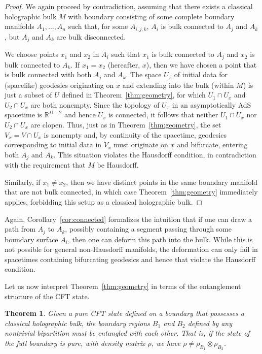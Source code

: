 \documentclass[12pt,english]{article}
\newtheorem{theorem}{Theorem}
\begin{document}
\begin{proof}
We again proceed by contradiction, assuming that there exists a classical holographic bulk $M$ with boundary consisting of some complete boundary manifolds $A_1,\ldots,A_n$ such that, for some $A_{i,j,k}$, $A_i$ is bulk connected to $A_j$ and $A_k$, but $A_j$ and $A_k$ are bulk disconnected. 

We choose points $x_1$ and $x_2$ in $A_i$ such that $x_1$ is bulk connected to $A_j$ and $x_2$ is bulk connected to $A_k$. If $x_1 = x_2$ (hereafter, $x$), then we have chosen a point that is bulk connected with both $A_j$ and $A_k$. The space $U_x$ of initial data for (spacelike) geodesics originating on $x$ and extending into the bulk (within $M$) is just a subset of $U$ defined in Theorem~\ref{thm:geometry}, for which $U_1 \cap U_x$ and $U_2 \cap U_x$ are both nonempty. Since the topology of $U_x$ in an asymptotically AdS spacetime is $\mathbb{R}^{D-2}$ and hence $U_x$ is connected, it follows that neither $U_1 \cap U_x$ nor $U_2 \cap U_x$ are clopen. Thus, just as in Theorem~\ref{thm:geometry}, the set $V_x = V \cap U_x$ is nonempty and, by continuity of the spacetime, geodesics corresponding to initial data in $V_x$ must originate on $x$ and bifurcate, entering both $A_j$ and $A_k$. This situation violates the Hausdorff condition, in contradiction with the requirement that $M$ be Hausdorff. 

Similarly, if $x_1 \neq x_2$, then we have distinct points in the same boundary manifold that are not bulk connected, in which case Theorem~\ref{thm:geometry} immediately applies, forbidding this setup as a classical holographic bulk.
\end{proof}

Again, Corollary~\ref{cor:connected} formalizes the intuition that if one can draw a path from $A_j$ to $A_k$, possibly containing a segment passing through some boundary surface $A_i$, then one can deform this path into the bulk. While this is not possible for general non-Hausdorff manifolds, the deformation can only fail in spacetimes containing bifurcating geodesics and hence that violate the Hausdorff condition.

Let us now interpret Theorem~\ref{thm:geometry} in terms of the entanglement structure of the CFT state.

\begin{theorem}\label{thm:entanglement} Given a pure CFT state defined on a boundary that possesses a classical holographic bulk, the boundary regions $B_1$ and $B_2$ defined by any nontrivial bipartition must be entangled with each other. That is, if the state of the full boundary is pure, with density matrix $\rho$, we have $\rho \neq \rho_{B_1}\otimes\rho_{B_2}$.\end{theorem}
\end{document}
